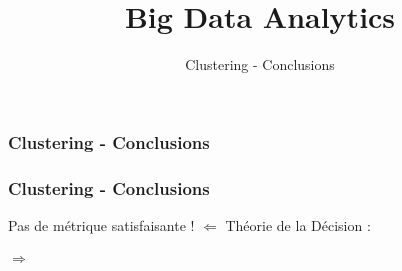 \documentclass{formation}
\title{Big Data Analytics}
\subtitle{Clustering - Conclusions}
\begin{document}
\begin{frame}
  \frametitle{Clustering - Conclusions}
\end{frame}

\begin{frame}
  \frametitle{Clustering - Conclusions}
  \begin{center}
    Pas de métrique satisfaisante ! $\Leftarrow$ Théorie de la Décision : \\
    $\;$ \\
     \\
    $\Rightarrow$ \\
  \end{center}
\end{frame}
\end{document}
